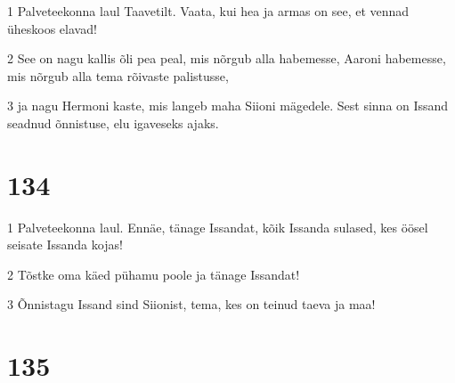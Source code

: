 \par 1 Palveteekonna laul Taavetilt. Vaata, kui hea ja armas on see, et vennad üheskoos elavad!
\par 2 See on nagu kallis õli pea peal, mis nõrgub alla habemesse, Aaroni habemesse, mis nõrgub alla tema rõivaste palistusse,
\par 3 ja nagu Hermoni kaste, mis langeb maha Siioni mägedele. Sest sinna on Issand seadnud õnnistuse, elu igaveseks ajaks.

\chapter{134}

\par 1 Palveteekonna laul. Ennäe, tänage Issandat, kõik Issanda sulased, kes öösel seisate Issanda kojas!
\par 2 Tõstke oma käed pühamu poole ja tänage Issandat!
\par 3 Õnnistagu Issand sind Siionist, tema, kes on teinud taeva ja maa!

\chapter{135}

